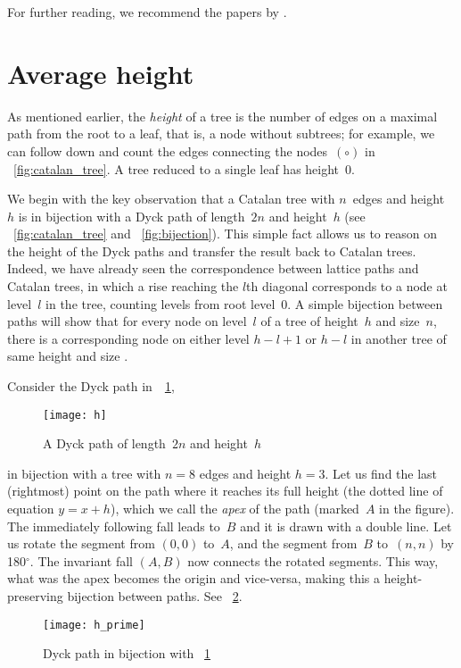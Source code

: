 For further reading, we recommend the papers by
\citet*{DershwowitzZaks_1980,DershowitzZaks_1981,DershowitzZaks_1990}.

\section{Average height}
\label{sec:Catalan_height}

As mentioned earlier, the \emph{height} of a tree is the number of
edges on a maximal path from the root to a leaf, that is, a node
without subtrees; for example, we can follow down and count the edges
connecting the nodes~\((\circ)\) in \fig~\ref{fig:catalan_tree}. A
tree reduced to a single leaf has height~\(0\).

We begin with the key observation that a Catalan tree with \(n\)~edges
and height~\(h\) is in bijection with a Dyck path of length~\(2n\) and
height~\(h\) (see \fig~\vref{fig:catalan_tree} and
\fig~\ref{fig:bijection}). This simple fact allows us to reason on the
height of the Dyck paths and transfer the result back to Catalan
trees. Indeed, we have already seen the correspondence between lattice
paths and Catalan trees, in which a rise reaching the $l$th diagonal
corresponds to a node at level~$l$ in the tree, counting levels from
root level~$0$. A simple bijection between paths will show that for
every node on level~$l$ of a tree of height~$h$ and size~$n$, there is
a corresponding node on either level $h-l+1$ or $h-l$ in another tree
of same height and size \citep{Rinderknecht_2013d}.

Consider the Dyck path in~\Fig~\ref{fig:h},
\begin{figure}
\centering
\texttt{[image: h]}
\caption{A Dyck path of length~\(2n\) and height~\(h\)}
\label{fig:h}
\end{figure}
in bijection with a tree with \(n=8\) edges and height \(h=3\). Let us
find the last (rightmost) point on the path where it reaches its full
height (the dotted line of equation \(y = x + h\)), which we call the
\emph{apex} of the path (marked~$A$ in the figure). The immediately
following fall leads to~$B$ and it is drawn with a double line. Let us
rotate the segment from $(0,0)$ to~$A$, and the segment from~$B$
to~$(n,n)$ by 180$^\circ$. The invariant fall $(A,B)$ now connects the
rotated segments. This way, what was the apex becomes the origin and
vice\hyp{}versa, making this a height\hyp{}preserving bijection
between paths. See \fig~\ref{fig:h_prime}.
\begin{figure}
\centering
\texttt{[image: h\_prime]}
\caption{Dyck path in bijection with \fig~\ref{fig:h}}
\label{fig:h_prime}
\end{figure}

